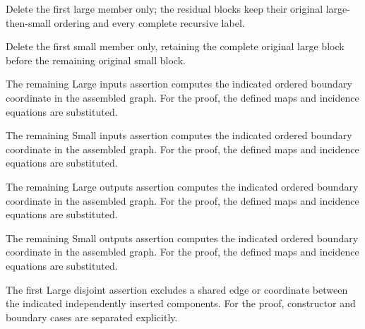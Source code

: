 Delete the first large member only; the residual blocks keep their original large-then-small ordering and every complete recursive label.
\par{}

Delete the first small member only, retaining the complete original large block before the remaining original small block.
\par{}

The remaining Large inputs assertion computes the indicated ordered boundary coordinate in the assembled graph.
For the proof, the defined maps and incidence equations are substituted.
\par{}

The remaining Small inputs assertion computes the indicated ordered boundary coordinate in the assembled graph.
For the proof, the defined maps and incidence equations are substituted.
\par{}

The remaining Large outputs assertion computes the indicated ordered boundary coordinate in the assembled graph.
For the proof, the defined maps and incidence equations are substituted.
\par{}

The remaining Small outputs assertion computes the indicated ordered boundary coordinate in the assembled graph.
For the proof, the defined maps and incidence equations are substituted.
\par{}

The first Large disjoint assertion excludes a shared edge or coordinate between the indicated independently inserted components.
For the proof, constructor and boundary cases are separated explicitly.
\par{}

